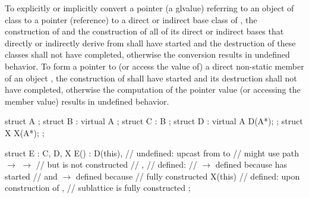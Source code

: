 \pnum
{}%
%
To explicitly or implicitly convert a pointer (a glvalue) referring to
an object of class
to a pointer (reference) to a direct or indirect base class
of
,
the construction of
and the construction of all of its direct or indirect bases that directly or
indirectly derive from
shall have started and the destruction of these classes shall not have
completed, otherwise the conversion results in undefined behavior.
To form a pointer to (or access the value of) a direct non-static member of
an object
,
the construction of
shall have started and its destruction shall not have completed,
otherwise the computation of the pointer value (or accessing the member
value) results in undefined behavior.
\begin{example}

\begin{codeblock}
struct A { };
struct B : virtual A { };
struct C : B { };
struct D : virtual A { D(A*); };
struct X { X(A*); };

struct E : C, D, X {
  E() : D(this),    // undefined: upcast from  to 
                    // might use path  $\rightarrow$  $\rightarrow$ 
                    // but  is not constructed
                    // , // defined:
                    //  $\rightarrow$  defined because  has started
                    // and  $\rightarrow$  defined because
                    //  fully constructed
  X(this) {         // defined: upon construction of ,
                    //  sublattice is fully constructed
  }
};
\end{codeblock}
\end{example}

